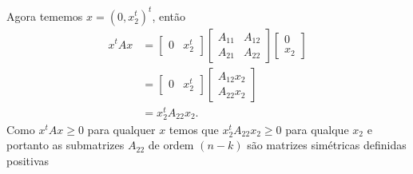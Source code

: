 \begin{questions}
\begin{solution}
        Agora tememos $x = (0, x_2^t)^t$, ent\~{a}o
        \begin{align*}
            x^t A x &= \begin{bmatrix}
                0 & x_2^t
            \end{bmatrix} \begin{bmatrix}
                A_{11} & A_{12} \\
                A_{21} & A_{22}
            \end{bmatrix} \begin{bmatrix}
                0 \\
                x_2
            \end{bmatrix} \\
            &= \begin{bmatrix}
                0 & x_2^t
            \end{bmatrix} \begin{bmatrix}
                A_{12} x_2 \\
                A_{22} x_2
            \end{bmatrix} \\
            &= x_2^t A_{22} x_2.
        \end{align*}
        Como $x^t A x \geq 0$ para qualquer $x$ temos que $x_2^t A_{22} x_2 \geq 0$ para qualque $x_2$ e portanto as submatrizes $A_{22}$ de ordem $(n - k)$ s\~{a}o matrizes sim\'{e}tricas definidas positivas
    \end{solution}
\end{questions}
